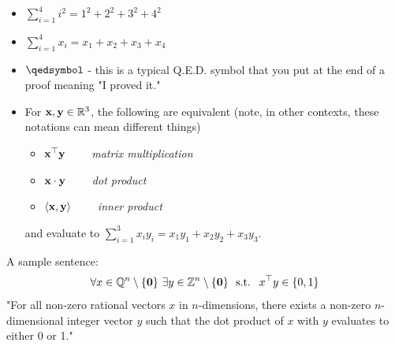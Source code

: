 \begin{itemize}
\item $\sum_{i=1}^4 i^2 = 1^2 + 2^2 + 3^2 + 4^2$
\item $\sum_{i=1}^4 x_i = x_1 + x_2 + x_3 + x_4$
\item $\qedsymbol$ - this is a typical Q.E.D. symbol that you put at the end of a proof meaning "I proved it."
\item For $\mathbf{x},\mathbf{y} \in {\mathbb{R}}^3$, the following are equivalent (note, in other contexts, these notations can mean different things)
\begin{itemize}
\item $\mathbf{x}^\top \mathbf{y}$ \ \ \ \ \emph{matrix multiplication}
\item $\mathbf{x} \cdot \mathbf{y}$ \ \ \ \ \emph{dot product}
\item $\langle \mathbf{x},\mathbf{y}\rangle$ \ \ \ \ \emph{inner product}
\end{itemize}
and evaluate to $\sum_{i=1}^3 x_i y_i = x_1 y_1 + x_2 y_2 + x_3 y_3$.
\end{itemize}


A sample sentence:
$$
\forall x \in \Q^n \setminus \{\mathbf{0}\} \ \exists y \in \Z^n\setminus \{\mathbf{0}\} \ \text{ s.t. } \ x^\top y \in \{0,1\}
$$
"For all non-zero rational vectors $x$ in $n$-dimensions, there exists a non-zero $n$-dimensional integer vector $y$ such that the dot product of $x$ with $y$ evaluates to either 0 or 1."


%
